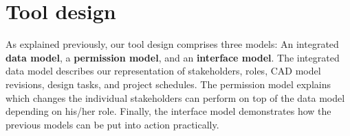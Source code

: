 \section{Tool design}
\label{sec:contribution}

As explained previously, our tool design comprises three models: An integrated \textbf{data model}, a \textbf{permission model}, and an \textbf{interface model}.
The integrated data model describes our representation of stakeholders, roles, CAD model revisions, design tasks, and project schedules.
The permission model explains which changes the individual stakeholders can perform on top of the data model depending on his/her role.
Finally, the interface model demonstrates how the previous models can be put into action practically.


%
